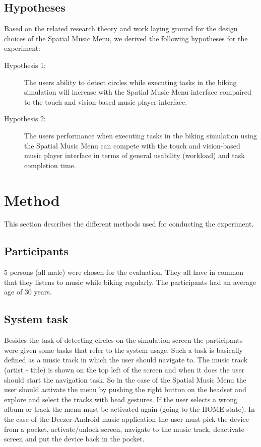 \subsection{Hypotheses}
\label{sec:evaluationhypothesis}
Based on the related research theory and work laying ground for the design choices of the Spatial Music Menu, we derived the following hypotheses for the experiment:

\begin{description}
\item[Hypothesis 1:] The users ability to detect circles while executing tasks in the biking simulation will increase with the Spatial Music Menu interface compaired to the touch and vision-based music player interface.
\end{description}

\begin{description}
\item[Hypothesis 2:] The users performance when executing tasks in the biking simulation using the Spatial Music Menu can compete with the touch and vision-based music player interface in terms of general usability (workload) and task completion time.
\end{description}


\section{Method}
This section describes the different methods used for conducting the experiment.

\subsection{Participants}
5 persons (all male) were chosen for the evaluation. They all have in common that they listens to music while biking regularly. The participants had an average age of 30 years.

\subsection{System task}
Besides the task of detecting circles on the simulation screen the participants were given some tasks that refer to the system usage. Such a task is basically defined as a music track in which the user should navigate to. The music track (artist - title) is shown on the top left of the screen and when it does the user should start the navigation task. So in the case of the Spatial Music Menu the user should activate the menu by pushing the right button on the headset and explore and select the tracks with head gestures. If the user selects a wrong album or track the menu must be activated again (going to the HOME state). In the case of the Deezer Android music application the user must pick the device from a pocket, activate/unlock screen, navigate to the music track, deactivate screen and put the device back in the pocket.


